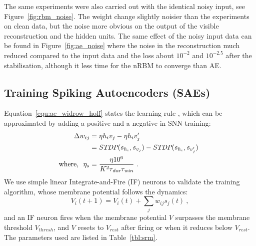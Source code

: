The same experiments were also carried out with the identical noisy input\DIFdelbegin {}\DIFdelend , see Figure~\ref{fig:rbm_noise}.
The weight change \DIFdelbegin {}\DIFdelend \DIFaddbegin {}\DIFaddend slightly noisier than the experiments on clean data, but the noise \DIFdelbegin {}\DIFdelend \DIFaddbegin {}\DIFaddend more obvious on the output of the visible reconstruction and the hidden units.
The same effect of the noisy input data can be found in Figure~\ref{fig:ae_noise} where the noise in the reconstruction \DIFdelbegin {}\DIFdelend \DIFaddbegin {}\DIFaddend much reduced compared to the input data and the loss \DIFdelbegin {}\DIFdelend \DIFaddbegin {}\DIFaddend about $10^{-2}$ and $10^{-2.5}$ after the stabilisation, although it \DIFdelbegin {}\DIFdelend \DIFaddbegin {}\DIFaddend less time for the nRBM to converge than AE.


\subsection{Training Spiking Autoencoders (SAEs)}
\DIFdelbegin %
\DIFdelend \DIFaddbegin \label{subsec:exp_SAE}
\DIFaddend Equation~\ref{equ:ae_widrow_hoff} states the learning rule \DIFdelbegin {}\DIFdelend \DIFaddbegin {}\DIFaddend , which can be approximated by adding a positive \DIFdelbegin {}\DIFdelend \DIFaddbegin {}\DIFaddend and a negative \DIFdelbegin {}\DIFdelend \DIFaddbegin {}\DIFaddend in SNN training:
\begin{equation}
\label{equ:sae}
\begin{aligned}
	\Delta w_{ij} &= \eta h_i v_j - \eta h_i v'_j \\
	&= \textit{\textrm{STDP}}(s_{h_i}, s_{v_j}) - \textit{\textrm{STDP}}(s_{h_i}, s_{v'_j})~ \\
	\textrm{where,~~} \eta_{s} &=  \frac{\eta 10^6}{K^2 \tau_{\textit{\textrm{dur}}} \tau_{\textit{\textrm{win}}}}~.
\end{aligned} 
\end{equation}
We use simple linear Integrate-and-Fire (IF) neurons to validate the training algorithm, whose membrane potential follows the dynamics:
\begin{equation}
V_i(t+1)=V_i(t) + \sum_j w_{ij} s_j(t)~,
\end{equation}
and an IF neuron fires when the membrane potential $V$ surpasses the membrane threshold $V_{thresh}$, and $V$ resets to $V_{rest}$ after firing or when it reduces below $V_{rest}$.
The parameters used are listed in Table~\ref{tbl:srm}.
\DIFaddbegin 

